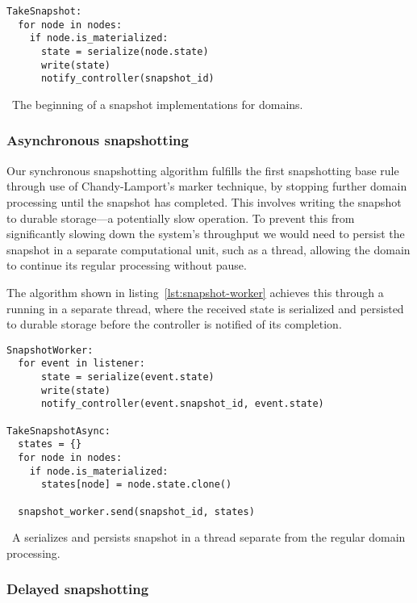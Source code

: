 \begin{listing}[H]
  \begin{verbatim}
TakeSnapshot:
  for node in nodes:
    if node.is_materialized:
      state = serialize(node.state)
      write(state)
      notify_controller(snapshot_id)
  \end{verbatim}
  \caption{\
    The beginning of a snapshot implementations for domains.
  }\label{lst:naive}
\end{listing}


\subsubsection{Asynchronous snapshotting}\label{sec:async-snapshot}

Our synchronous snapshotting algorithm fulfills the first snapshotting base rule
through use of Chandy-Lamport's marker technique, by stopping further domain
processing until the snapshot has completed. This involves writing the snapshot
to durable storage---a potentially slow operation. To prevent this from
significantly slowing down the system's throughput we would need to persist the
snapshot in a separate computational unit, such as a thread, allowing the
domain to continue its regular processing without pause.

The algorithm shown in listing~\ref{lst:snapshot-worker} achieves this through a
\code{SnapshotWorker} running in a separate thread, where the received state is
serialized and persisted to durable storage before the controller is notified of
its completion.

\begin{listing}[H]
  \begin{verbatim}
SnapshotWorker:
  for event in listener:
      state = serialize(event.state)
      write(state)
      notify_controller(event.snapshot_id, event.state)

TakeSnapshotAsync:
  states = {}
  for node in nodes:
    if node.is_materialized:
      states[node] = node.state.clone()

  snapshot_worker.send(snapshot_id, states)
  \end{verbatim}
  \caption{\
    A  serializes and persists snapshot in a thread
    separate from the regular domain processing.
  }\label{lst:snapshot-worker}
\end{listing}

\subsubsection{Delayed snapshotting}

